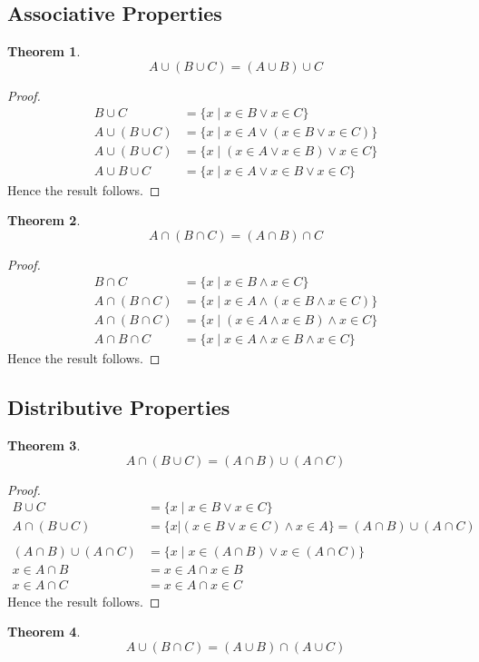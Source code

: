 \documentclass{article}  %
\newtheorem{theorem}{Theorem}[section]
\theoremstyle{definition}
\begin{document}
\subsection{Associative Properties}
\begin{theorem}
\[
    A\cup(B\cup C) = (A\cup B) \cup C
\]
\end{theorem}
\begin{proof}

\[
\begin{aligned}
    B \cup C &= \{x \mid x \in B \lor x \in C \} \\
    A \cup (B \cup C) &= \{x \mid x \in A \lor (x \in B \lor x \in C)\} \\
    A \cup (B \cup C) &= \{x \mid (x \in A \lor x \in B) \lor x \in C\} \\
    A \cup B \cup C &= \{x \mid x \in A \lor x \in B \lor x \in C\}
\end{aligned}
\]
Hence the result follows.
\end{proof}


\begin{theorem}
\[
    A\cap(B\cap C) = (A\cap B) \cap C
\]
\end{theorem}
\begin{proof}

\[
\begin{aligned}
    B \cap C &= \{x \mid x \in B \land x \in C \} \\
    A \cap (B \cap C) &= \{x \mid x \in A \land (x \in B \land x \in C)\} \\
    A \cap (B \cap C) &= \{x \mid (x \in A \land x \in B) \land x \in C\} \\
    A \cap B \cap C &= \{x \mid x \in A \land x \in B \land x \in C\}
\end{aligned}
\]
Hence the result follows.
\end{proof}

\subsection{Distributive Properties}
\begin{theorem}
    \[
        A \cap (B \cup C) = (A \cap B) \cup (A \cap C)
    \]
\end{theorem}

\begin{proof}
\[
\begin{aligned}
    B\cup C &= \{x \mid x \in B \lor x \in C \} \\
    A\cap (B\cup C) &= \{x| (x \in B \lor x \in C ) \land x \in A\} = (A \cap B) \cup (A \cap C)\\\\
    (A \cap B) \cup (A \cap C)&=\{x \mid x \in (A \cap B) \lor x \in (A \cap C)\}\\
    x \in A \cap B &= x \in A \cap x \in B\\
    x \in A \cap C &= x \in A \cap x \in C
\end{aligned}
\]
Hence the result follows.
\end{proof}
\begin{theorem}
    \[
        A \cup (B \cap C) = (A \cup B) \cap (A \cup C)
    \]
\end{theorem}
\end{document}
